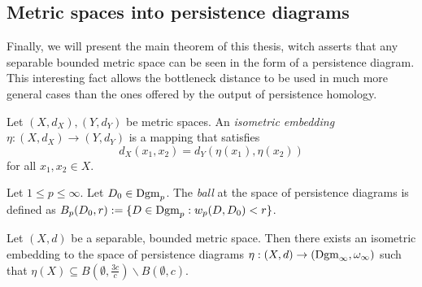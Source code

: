 \subsection{Metric spaces into persistence diagrams} \label{sec:embedding}

Finally, we will present the main theorem of this thesis, witch asserts that any separable bounded metric space can be seen in the form of a persistence diagram. This interesting fact allows the bottleneck distance to be used in much more general cases than the ones offered by the output of persistence homology.

\begin{definition}
    Let $ (X, d_X), (Y, d_Y) $ be metric spaces. An {\it isometric embedding} $ \eta: (X, d_X) \to (Y, d_Y) $ is a mapping that satisfies
    $$
        d_X(x_1, x_2) = d_Y(\eta(x_1), \eta(x_2))
    $$
    for all $x_1, x_2 \in X$.
\end{definition}

\begin{definition}
    Let $ 1\leq p \leq \infty $. Let $ D_0 \in \operatorname{Dgm}_p $. The {\it ball} at the space of persistence diagrams is defined as $ B_p(D_0, r) := \{D \in \operatorname{Dgm}_p : w_p(D, D_0) < r \} $.
\end{definition}

\begin{theorem} \label{thm:embedding}
    Let $ (X, d) $ be a separable, bounded metric space. Then there exists an isometric embedding to the space of persistence diagrams $ \eta: (X, d) \to (\operatorname{Dgm}_\infty, \omega_\infty)$ such that $ \eta(X) \subseteq B(\emptyset, \frac{3c}{c}) \backslash B(\emptyset, c) $.
\end{theorem}

